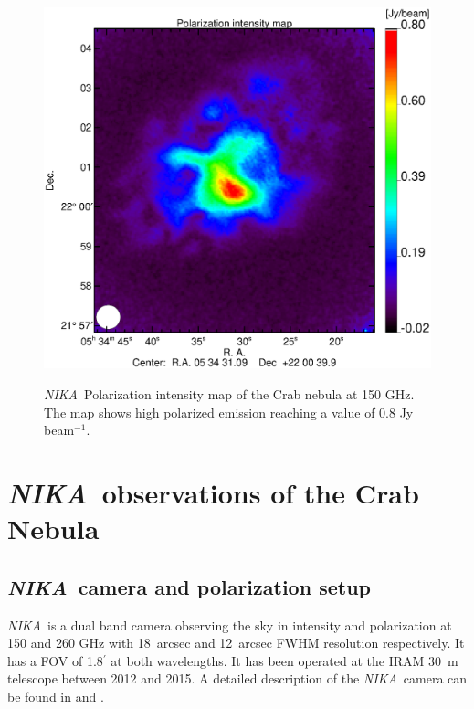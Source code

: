 \documentclass[twocolumn,traditabstract]{aa}
\def\NIKA{\textit{NIKA}}
\begin{document}
 \begin{figure}
  \centering
      {\includegraphics[width=0.75\linewidth,keepaspectratio]{figures/Crab_ipol2_2mm.eps}}
\caption{\NIKA\ Polarization intensity map of the  Crab nebula at 150 GHz. The map shows high polarized emission reaching a value of 0.8 Jy beam$^{-1}$.}
\label{crab_ipol_maps}		
  \end{figure}
 

\section{\NIKA\ observations of the Crab Nebula}\label{sec:NIKA observations}
\subsection{\NIKA\ camera and polarization setup}\label{sec:nika camera}
\NIKA\ is a dual band camera observing the sky in intensity and polarization at
150 and 260 GHz with 18~arcsec and 12~arcsec FWHM resolution respectively. It
has a FOV of 1.8$^{\prime}$ at both wavelengths. It has been operated at the
IRAM 30~m telescope between 2012 and 2015. A detailed description of the
\NIKA\ camera can be found in \citet{monfardini2010, monfardini2011} and
\citet{catalano2014}.
\end{document}
